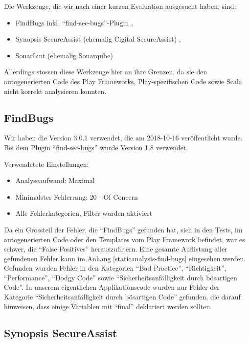 \documentclass[12pt,DIV14,BCOR10mm,a4paper,twoside,parskip=half-,headsepline,headinclude,english,ngerman,bibliography=totocnumbered]{scrreprt}
\begin{document}
Die Werkzeuge, die wir nach einer kurzen Evaluation ausgesucht haben, sind:

\begin{itemize}
  \item FindBugs \autocite{FindBugs} inkl. \enquote{find-sec-bugs}-Plugin \autocite{FindBugs.FindSecBugs},
  \item Synopsis SecureAssist (ehemalig Cigital SecureAssist) \autocite{SecureAssist},
  \item SonarLint (ehemalig Sonarqube) \autocite{SonarLint}
\end{itemize}

Allerdings stossen diese Werkzeuge hier an ihre Grenzen, da sie den autogenerierten Code des Play Frameworks, Play-spezifischen Code sowie Scala nicht korrekt analysieren konnten.

\subsection{FindBugs}

Wir haben die Version 3.0.1 verwendet, die am 2018-10-16 veröffentlicht wurde.
Bei dem Plugin \enquote{find-sec-bugs} wurde Version 1.8 verwendet.

Verwendetete Einstellungen:

\begin{itemize}
  \item Analyseaufwand: Maximal
  \item Minimalster Fehlerrang: 20 - Of Concern
  \item Alle Fehlerkategorien, Filter wurden aktiviert
\end{itemize}

Da ein Grossteil der Fehler, die \enquote{FindBugs} gefunden hat, sich in den Tests, im autogenerierten Code oder den Templates vom Play Framework befindet, war es schwer, die \enquote{False Positives} herauszufiltern.
Eine gesamte Auflistung aller gefundenen Fehler kann im Anhang \ref{staticanalysis-find-bugs} eingesehen werden.
Gefunden wurden Fehler in den Kategorien \enquote{Bad Practice}, \enquote{Richtigkeit}, \enquote{Performance}, \enquote{Dodgy Code} sowie \enquote{Sicherheitsanfälligkeit durch bösartigen Code}.
In unserem eigentlichen Applikationscode wurden nur Fehler der Kategorie \enquote{Sicherheitsanfälligkeit durch bösartigen Code} gefunden, die darauf hinweisen, dass einige Variablen mit \enquote{final} deklariert werden sollten.

\subsection{Synopsis SecureAssist}
\end{document}
